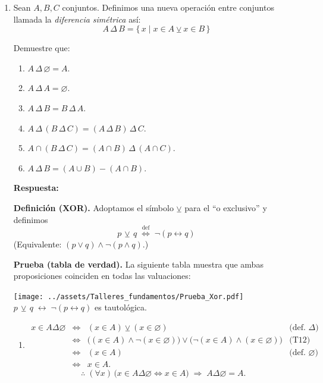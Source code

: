 \documentclass[12pt,letterpaper]{exam}
\begin{document}
\begin{enumerate}
\begin{enumerate}[label=\alph*)]
\end{enumerate}


    \item Sean $A, B, C$ conjuntos. Definimos una nueva operación entre conjuntos llamada la \textit{diferencia simétrica} así:
    \[
    A \,\Delta\, B = \{\, x \mid x \in A \veebar x \in B \,\}
    \]
    
    Demuestre que:

    \begin{enumerate}[label=\alph*)]
        \item $A \,\Delta\, \varnothing = A.$
        \item $A \,\Delta\, A = \varnothing.$
        \item $A \,\Delta\, B = B \,\Delta\, A.$
        \item $A \,\Delta\, (B \,\Delta\, C) = (A \,\Delta\, B) \,\Delta\, C.$
        \item $A \cap (B \,\Delta\, C) = (A \cap B) \,\Delta\, (A \cap C).$
        \item $A \,\Delta\, B = (A \cup B) - (A \cap B).$
    \end{enumerate}
    \textbf{Respuesta:}

\noindent\textbf{Definición (XOR).}
Adoptamos el símbolo $\veebar$ para el “o exclusivo” y definimos
\[
\boxed{\,p \,\text{$\veebar$}\, q \;\stackrel{\mathrm{def}}{\Longleftrightarrow}\; \neg(p\leftrightarrow q)\,}
\]
(Equivalente: \((p\lor q)\land\neg(p\land q)\).)

\noindent\textbf{Prueba (tabla de verdad).}
La siguiente tabla muestra que ambas proposiciones coinciden en todas las valuaciones:
\begin{center}
  \texttt{[image: ../assets/Talleres\_fundamentos/Prueba\_Xor.pdf]}\\
  \small \(p \,\text{$\veebar$}\, q \;\leftrightarrow\; \neg(p\leftrightarrow q)\) es tautológica.
\end{center}

    

\begin{enumerate}[label=\alph*)]

\item
\[
\begin{array}{rcll}
x\in A\Delta\varnothing
&\iff& (x\in A)\veebar(x\in\varnothing) & \text{(def.\ $\Delta$)}\\[2pt]
&\iff& \big((x\in A)\land\neg(x\in\varnothing)\big)\lor\big(\neg(x\in A)\land(x\in\varnothing)\big) & \text{(T12)}\\[2pt]
&\iff& (x\in A) & \text{(def.\ $\varnothing$)}\\[2pt]
&\iff& x\in A.
\end{array}
\]
\[
\therefore\; (\forall x)\,\big(x\in A\Delta\varnothing \iff x\in A\big)
\;\Rightarrow\; A\Delta\varnothing = A.
\]


\end{enumerate}
\end{enumerate}
\end{document}
